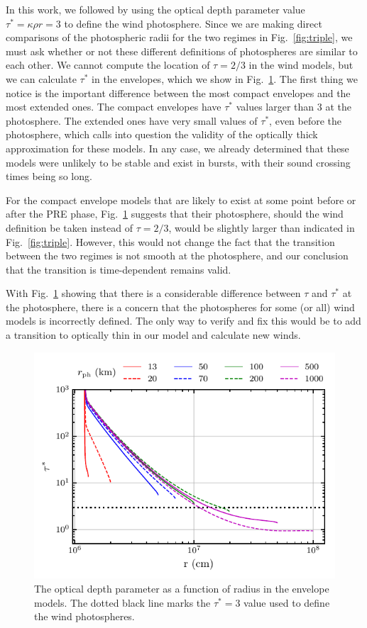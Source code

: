 \documentclass[../main.tex]{subfiles}
\begin{document}
In this work, we followed \citet{Paczynski1986b} by using the optical depth parameter value $\tau^*=\kappa\rho r=3$ to define the wind photosphere. Since we are making direct comparisons of the photospheric radii for the two regimes in Fig.~\ref{fig:triple}, we must ask whether or not these different definitions of photospheres are similar to each other. We cannot compute the location of $\tau=2/3$ in the wind models, but we can calculate $\tau^*$ in the envelopes, which we show in Fig.~\ref{fig:env_taustar}. The first thing we notice is the important difference between the most compact envelopes and the most extended ones. The compact envelopes have $\tau^*$ values larger than 3 at the photosphere. The extended ones have very small values of $\tau
^*$, even before the photosphere, which calls into question the validity of the optically thick approximation for these models. In any case, we already determined that these models were unlikely to be stable and exist in bursts, with their sound crossing times being so long.  

For the compact envelope models that are likely to exist at some point before or after the PRE phase, Fig.~\ref{fig:env_taustar} suggests that their photosphere, should the wind definition be taken instead of $\tau=2/3$, would be slightly larger than indicated in Fig.~\ref{fig:triple}. However, this would not change the fact that the transition between the two regimes is not smooth at the photosphere, and our conclusion that the transition is time-dependent remains valid. 

With Fig.~\ref{fig:env_taustar} showing that there is a considerable difference between $\tau$ and $\tau^*$ at the photosphere, there is a concern that the photospheres for some (or all) wind models is incorrectly defined. The only way to verify and fix this would be to add a transition to optically thin in our model and calculate new winds.  

\begin{figure}[htb!]
    \centering
    \includegraphics{figures/env_taustar.pdf}
    \caption[Optical depth parameter in the envelope models]{The optical depth parameter as a function of radius in the envelope models. The dotted black line marks the $\tau^*=3$ value used to define the wind photospheres.}
    \label{fig:env_taustar}
\end{figure}

\biblio
\end{document}

